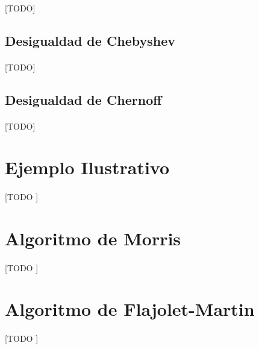 \documentclass{subfiles}
\begin{document}
        \paragraph{}
        [TODO]

      \subsection{Desigualdad de Chebyshev}
      \label{sec:streaming_chebyshev}

        \paragraph{}
        [TODO]

      \subsection{Desigualdad de Chernoff}
      \label{sec:streaming_chernoff}

        \paragraph{}
        [TODO]


    \section{Ejemplo Ilustrativo}
    \label{sec:streaming_puzzle}

      \paragraph{}
      [TODO ]


    \section{Algoritmo de Morris}
    \label{sec:streaming_morris_algorithm}

      \paragraph{}
      [TODO ]


    \section{Algoritmo de Flajolet-Martin}
    \label{sec:streaming_morris_algorithm}

      \paragraph{}
      [TODO ]
\end{document}
